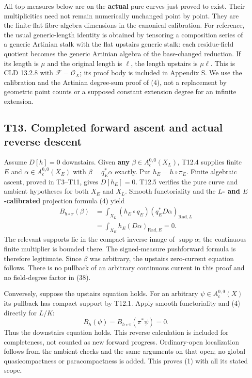 \documentclass[
  10pt,
]{article}
\begin{document}
All top measures below are on the \textbf{actual} pure curves just
proved to exist. Their multiplicities need not remain numerically
unchanged point by point. They are the finite-flat fibre-algebra
dimensions in the canonical calibration. For reference, the usual
generic-length identity is obtained by tensoring a composition series of
a generic Artinian stalk with the flat upstairs generic stalk: each
residue-field quotient becomes the generic Artinian algebra of the
base-changed reduction. If its length is \(\mu\) and the original length
is \(\ell\), the length upstairs is \(\mu\ell\). This is CLD 13.2.8 with
\(\mathcal F=\mathcal O_X\); its proof body is included in Appendix S.
We use the calibration and the Artinian degree-sum proof of (4), not a
replacement by geometric point counts or a supposed constant extension
degree for an infinite extension.

\subsection{T13. Completed forward ascent and actual reverse
descent}\label{t13.-completed-forward-ascent-and-actual-reverse-descent}

Assume \(D[h]=0\) downstairs. Given \textbf{any}
\(\beta\in A_c^{0,0}(X_L)\), T12.4 supplies finite \(E\) and
\(\alpha\in A_c^{0,0}(X_E)\) with \(\beta=q_E^*\alpha\) exactly. Put
\(h_E=h\circ\pi_E\). Finite algebraic ascent, proved in T3--T11, gives
\(D[h_E]=0\). T12.5 verifies the pure curve and ambient hypotheses for
both \(X_E\) and \(X_L\). Smooth functoriality and the \textbf{\(L\)-
and \(E\)-calibrated} projection formula (4) yield \[
 \begin{aligned}
 B_{h\circ\pi}(\beta)
 &=\int_{X_L}(h_E\circ q_E)(q_E^*D\alpha)_{\mathrm{Rad},L}\\
 &=\int_{X_E}h_E(D\alpha)_{\mathrm{Rad},E}
 =0.
 \end{aligned}                                             \tag{38}
\] The relevant supports lie in the compact inverse image of
\(\operatorname{supp}\alpha\); the continuous finite multiplier is
bounded there. The signed-measure pushforward formula is therefore
legitimate. Since \(\beta\) was arbitrary, the upstairs zero-current
equation follows. There is no pullback of an arbitrary continuous
current in this proof and no field-degree factor in (38).

Conversely, suppose the upstairs equation holds. For an arbitrary
\(\psi\in A_c^{0,0}(X)\) its pullback has compact support by T12.1.
Apply smooth functoriality and (4) directly for \(L/K\): \[
             B_h(\psi)=B_{h\circ\pi}(\pi^*\psi)=0.        \tag{39}
\] Thus the downstairs equation holds. This reverse calculation is
included for completeness, not counted as new forward progress.
Ordinary-open localization follows from the ambient checks and the same
arguments on that open; no global quasicompactness or paracompactness is
added. This proves (1) with all its stated scope.
\end{document}
